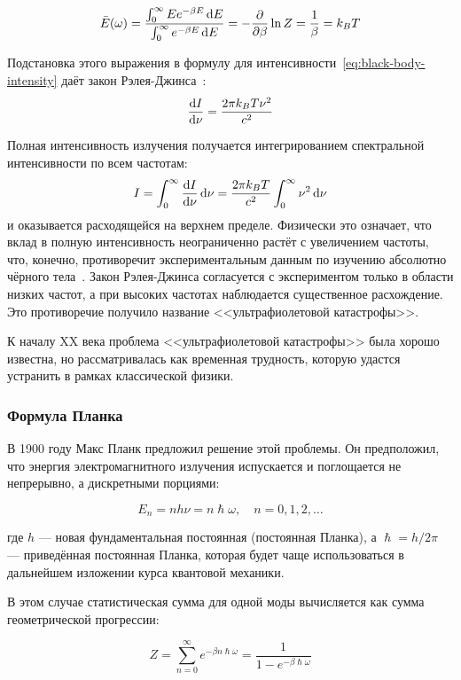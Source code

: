 \documentclass[a4paper, 12pt]{article}
\begin{document}
\[
\bar{E}(\omega) = \frac{\int_0^\infty E e^{-\beta E} \dd{E}}{\int_0^\infty e^{-\beta E} \dd{E}} = -\pdv{\beta} \ln Z = \frac{1}{\beta} = k_B T
\]

Подстановка этого выражения в формулу для интенсивности~\eqref{eq:black-body-intensity} даёт закон Рэлея-Джинса~\cite{Rayleigh1900,Jeans1905}:
\begin{equation}
  \label{eq:rayleigh-jeans-law}
  \dv{I}{\nu} = \frac{2\pi k_B T \nu^2}{c^2}
\end{equation}

Полная интенсивность излучения получается интегрированием спектральной интенсивности по всем частотам:
\[
I = \int_0^\infty \dv{I}{\nu} \dd{\nu} = \frac{2\pi k_B T}{c^2} \int_0^\infty \nu^2 \dd{\nu}
\]
и оказывается расходящейся на верхнем пределе. Физически это означает, что вклад в полную интенсивность неограниченно растёт с увеличением частоты, что, конечно, противоречит экспериментальным данным по изучению абсолютно чёрного тела~\cite{Beckmann1898,Rubens1899,RubensKurlbaum1900,LummerPringsheim1900}. Закон Рэлея-Джинса согласуется с экспериментом только в области низких частот, а при высоких частотах наблюдается существенное расхождение. Это противоречие получило название <<ультрафиолетовой катастрофы>>.

К началу XX века проблема <<ультрафиолетовой катастрофы>> была хорошо известна, но рассматривалась как временная трудность, которую удастся устранить в рамках классической физики.

\subsubsection*{Формула Планка}

В 1900 году Макс Планк предложил решение этой проблемы. Он предположил, что энергия электромагнитного излучения испускается и поглощается не непрерывно, а дискретными порциями:

\[
E_n = n h \nu = n \hslash \omega, \quad n = 0, 1, 2, \dots
\]

где $h$ — новая фундаментальная постоянная (постоянная Планка), а $\hslash = h/2\pi$ — приведённая постоянная Планка, которая будет чаще использоваться в дальнейшем изложении курса квантовой механики.

В этом случае статистическая сумма для одной моды вычисляется как сумма геометрической прогрессии:

\[
Z = \sum_{n=0}^\infty e^{-\beta n \hslash \omega} = \frac{1}{1 - e^{-\beta \hslash \omega}}
\]
\end{document}
